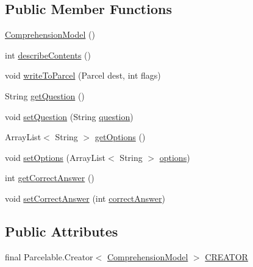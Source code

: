 \subsection*{Public Member Functions}
\begin{DoxyCompactItemize}
\item 
\hyperlink{classorg_1_1buildmlearn_1_1comprehension_1_1data_1_1ComprehensionModel_a4d6913ed3ec02998b73f1adefb476dab}{Comprehension\+Model} ()
\item 
int \hyperlink{classorg_1_1buildmlearn_1_1comprehension_1_1data_1_1ComprehensionModel_a4acb2b8db3ea555ab113775108d845b0}{describe\+Contents} ()
\item 
void \hyperlink{classorg_1_1buildmlearn_1_1comprehension_1_1data_1_1ComprehensionModel_ac2d9d63e63c01669090f29c61d06d2a0}{write\+To\+Parcel} (Parcel dest, int flags)
\item 
String \hyperlink{classorg_1_1buildmlearn_1_1comprehension_1_1data_1_1ComprehensionModel_a94a633ce40d8abcde25275f7e6f8d782}{get\+Question} ()
\item 
void \hyperlink{classorg_1_1buildmlearn_1_1comprehension_1_1data_1_1ComprehensionModel_ad285c53613c6794939430f7fe98bfa44}{set\+Question} (String \hyperlink{classorg_1_1buildmlearn_1_1comprehension_1_1data_1_1ComprehensionModel_a1ee55ec99912483b4905b501a1660938}{question})
\item 
Array\+List$<$ String $>$ \hyperlink{classorg_1_1buildmlearn_1_1comprehension_1_1data_1_1ComprehensionModel_aafaa8cd684e49376c9e6808b9bca61ab}{get\+Options} ()
\item 
void \hyperlink{classorg_1_1buildmlearn_1_1comprehension_1_1data_1_1ComprehensionModel_a976eb297094c85174fc3817d4ec9f4a5}{set\+Options} (Array\+List$<$ String $>$ \hyperlink{classorg_1_1buildmlearn_1_1comprehension_1_1data_1_1ComprehensionModel_a553764471ee458e9f5b8808fc24382c3}{options})
\item 
int \hyperlink{classorg_1_1buildmlearn_1_1comprehension_1_1data_1_1ComprehensionModel_a532547c71d79ec56ed0603454d3024e0}{get\+Correct\+Answer} ()
\item 
void \hyperlink{classorg_1_1buildmlearn_1_1comprehension_1_1data_1_1ComprehensionModel_a3a9803479546b37978ad706af5c35787}{set\+Correct\+Answer} (int \hyperlink{classorg_1_1buildmlearn_1_1comprehension_1_1data_1_1ComprehensionModel_ab07a660cb3b99ce9c8f9d8344dd6d008}{correct\+Answer})
\end{DoxyCompactItemize}
\subsection*{Public Attributes}
\begin{DoxyCompactItemize}
\item 
final Parcelable.\+Creator$<$ \hyperlink{classorg_1_1buildmlearn_1_1comprehension_1_1data_1_1ComprehensionModel}{Comprehension\+Model} $>$ \hyperlink{classorg_1_1buildmlearn_1_1comprehension_1_1data_1_1ComprehensionModel_af19440431a4796389d2f724a85ef7337}{C\+R\+E\+A\+T\+OR}
\end{DoxyCompactItemize}
